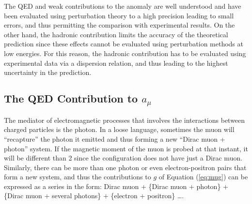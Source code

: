 \documentclass{outhesis}
\begin{document}
The QED and weak contributions to the anomaly are well understood and have been evaluated using perturbation theory to a high precision leading to small errors, and thus permitting the comparison with experimental results. On the other hand, the hadronic contribution limits the accuracy of the theoretical prediction since these effects cannot be evaluated using perturbation methods at low energies. For this reason, the hadronic contribution has to be evaluated using experimental data via a dispersion relation, and thus leading to the highest uncertainty in the prediction.

\subsection{The QED Contribution to $a_{\mu}$}

The mediator of electromagnetic processes that involves the interactions between charged particles is the photon. In a loose language, sometimes the muon will ``recapture'' the photon it emitted and thus forming a new ``Dirac muon + photon'' system.%
If the magnetic moment of the muon is probed at that instant, it will be different than 2 since the configuration does not have just a Dirac muon. Similarly, there can be more than one photon or even electron-positron pairs that form a new system, and thus the contributions to $g$ of Equation (\ref{eq:mug}) can be expressed as a series in the form: Dirac muon + \{Dirac muon + photon\} + \{Dirac muon + several photons\} + \{electron + positron\} \ldots.
\end{document}
